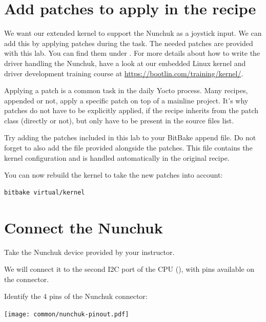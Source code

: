 \section{Add patches to apply in the recipe}

We want our extended
{} kernel to support the Nunchuk as
a joystick input. We can add this by applying patches during the
 task. The needed patches are provided with this lab. You can
find them under . For more
details about how to write the driver handling the Nunchuk, have a look at our
embedded Linux kernel and driver development training course at
\url{https://bootlin.com/training/kernel/}.

Applying a patch is a common task in the daily Yocto process. Many recipes,
appended or not, apply a specific patch on top of a mainline project. It's why
patches do not have to be explicitly applied, if the recipe inherits from the
patch class (directly or not), but only have to be present in the source files
list.

Try adding the patches included in this lab to your BitBake append
file. Do not forget to also add the  file provided
alongside the patches. This file contains the kernel configuration and
is handled automatically in the 
{} original recipe.

You can now rebuild the kernel to take the new patches into account:
\begin{verbatim}
bitbake virtual/kernel
\end{verbatim}

\section{Connect the Nunchuk}

Take the Nunchuk device provided by your instructor.

We will connect it to the second I2C port of the CPU (),
with pins available on the  connector.

Identify the 4 pins of the Nunchuk connector:

\begin{center}
\texttt{[image: common/nunchuk-pinout.pdf]}
\end{center}

